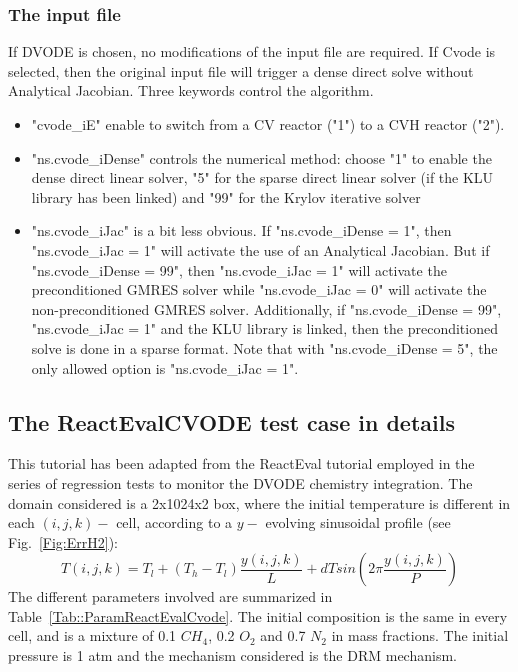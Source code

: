 \documentclass[12pt]{article}
\begin{document}
\subsubsection{The input file}
If DVODE is chosen, no modifications of the input file are required. If Cvode is selected, then the original input file will trigger a dense direct solve without Analytical Jacobian. Three keywords control the algorithm.
\begin{itemize}
\item "cvode_iE" enable to switch from a CV reactor ("1") to a CVH reactor ("2").
\item "ns.cvode_iDense" controls the numerical method: choose "1" to enable the dense direct linear solver, "5" for the sparse direct linear solver (if the KLU library has been linked) and "99" for the Krylov iterative solver
\item "ns.cvode_iJac" is a bit less obvious. If "ns.cvode_iDense = 1", then "ns.cvode_iJac = 1" will activate the use of an Analytical Jacobian. But if "ns.cvode_iDense = 99", then "ns.cvode_iJac = 1" will activate the preconditioned GMRES solver while "ns.cvode_iJac = 0" will activate the non-preconditioned GMRES solver. Additionally, if "ns.cvode_iDense = 99", "ns.cvode_iJac = 1" and the KLU library is linked, then the preconditioned solve is done in a sparse format. Note that with "ns.cvode_iDense = 5", the only allowed option is "ns.cvode_iJac = 1".
\end{itemize}


\subsection{The ReactEvalCVODE test case in details}
\label{subs::ReactEvalCvode}
This tutorial has been adapted from the ReactEval tutorial employed in the series of regression tests to monitor the DVODE chemistry integration. The domain considered is a 2x1024x2 box, where the initial temperature is different in each $(i,j,k)-$ cell, according to a $y-$ evolving sinusoidal profile (see Fig.~\ref{Fig:ErrH2}):
\begin{equation}
T(i,j,k) =  T_l + (T_h-T_l)\frac{y(i,j,k)}{L} + dTsin\left(2\pi\frac{y(i,j,k)}{P}\right) 
\end{equation}
The different parameters involved are summarized in Table~\ref{Tab::ParamReactEvalCvode}. The initial composition is the same in every cell, and is a mixture of 0.1  $CH_4$, 0.2 $O_2$ and 0.7 $N_2$ in mass fractions. The initial pressure is 1 atm and the mechanism considered is the DRM mechanism.
\end{document}
